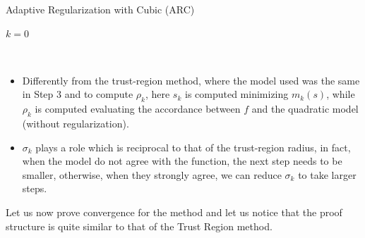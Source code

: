 \documentclass[10pt,a4paper]{article}
\begin{document}
\begin{algorithm}[H]\label{alg:arc}
	\caption{Adaptive Regularization with Cubic (ARC)}
	
	
	$k = 0$
	
	\While{$||\grad(x_k)||>\epsilon$}{
		
		Compute a step $s_k$ such that $m_k(s_k)\leq m_k(0)$ and $\|\nabla m_k(s_k)\|\leq \frac{1}{2}\theta ||s_k||^2$
		
		Compute $\rho_k:= \frac{f(x_k)-f(x_k+s_k)}{q_k(0)-q_k(s_k)}$
		
		\If{$\rho_k\geq \eta_1$}{$x_{k+1} = x_k +s_k$}
		
		\Else{$x_{k+1} = x_k$}
		
		$\sigma_{k+1} = \begin{cases}
			\max\{\gamma_1 \sigma_k, \sigma_{min} \} \quad &\text{if } \rho_k\geq \eta_2\\
			\sigma_k \quad &\text{if } \rho_k\in [\eta_1, \eta_2)\\
			\gamma_2 \sigma_k \quad &\text{if } \rho_k<\eta_1\\
		\end{cases}$
		
		$k = k+1$
	}
\end{algorithm}
\begin{remark}
	$ $
	\begin{itemize}
		\item Differently from the trust-region method, where the model used was the same in Step 3 and to compute $\rho_k$, here $s_k$ is computed minimizing $m_k(s)$, while $\rho_k$ is computed evaluating the accordance between $f$ and the quadratic model (without regularization). 
		\item $\sigma_k$ plays a role which is reciprocal to that of the trust-region radius, in fact, when the model do not agree with the function, the next step needs to be smaller, otherwise, when they strongly agree, we can reduce $\sigma_k$ to take larger steps. 
	\end{itemize}
\end{remark}

Let us now prove convergence for the method and let us notice that the proof structure is quite similar to that of the Trust Region method. 
\end{document}
